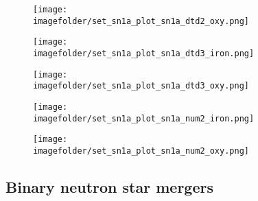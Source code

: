 {\begin{figure}[h]
\end{figure}
\begin{figure}[h]
  \centering
  \texttt{[image: \\imagefolder/set\_sn1a\_plot\_sn1a\_dtd2\_oxy.png]}
\end{figure}
\begin{figure}[h]
  \centering
  \texttt{[image: \\imagefolder/set\_sn1a\_plot\_sn1a\_dtd3\_iron.png]}
\end{figure}
\begin{figure}[h]
  \centering
  \texttt{[image: \\imagefolder/set\_sn1a\_plot\_sn1a\_dtd3\_oxy.png]}
\end{figure}
\begin{figure}[h]
  \centering
  \texttt{[image: \\imagefolder/set\_sn1a\_plot\_sn1a\_num2\_iron.png]}
\end{figure}
\begin{figure}[h]
  \centering
  \texttt{[image: \\imagefolder/set\_sn1a\_plot\_sn1a\_num2\_oxy.png]}
\end{figure}

\subsection{Binary neutron star mergers}
\iffalse
Filenames:
set_nsm_plot_combo_rates.png      
set_nsm_plot_combo_spectro.png    
set_nsm_plot_dtd.png              
set_nsm_plot_ejmass.png           
set_nsm_plot_final_rates.png             
set_nsm_plot_final_spectro.png           
set_nsm_plot_mergerfraction_rates.png    
set_nsm_plot_mergerfraction_spectro.png  
set_nsm_plot_nbnsm_rates.png             
set_nsm_plot_nbnsm_spectro.png
\fi


}
